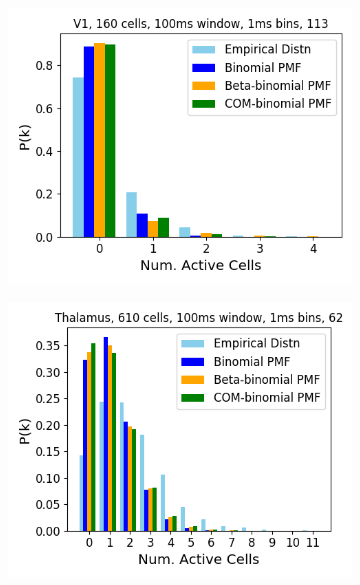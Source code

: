 \begin{figure}[p]
\begin{subfigure}[h]{0.5\linewidth}
        \includegraphics[width=\linewidth]{figures/conway_maxwell/v1_1ms_trial_113_example.png}
        \label{fig:v1_1ms_trial_113_example}
      \end{subfigure}
      \begin{subfigure}[h]{0.5\linewidth}
        \includegraphics[width=\linewidth]{figures/conway_maxwell/thalamus_1ms_trial_62_example.png}
        \label{fig:thalamus_1ms_trial_62_example}
      \end{subfigure}
      \begin{subfigure}[h]{0.5\linewidth}

\end{subfigure}
\end{figure}
